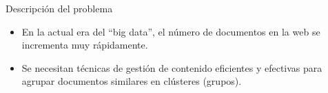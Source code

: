 \begin{frame}{Descripción del problema}
    
    \begin{itemize}
        \item 
        En la actual era del ``big data'', el 
        número de documentos en la web se 
        incrementa muy rápidamente.
        \item 
        Se necesitan técnicas de gestión 
        de contenido eficientes y efectivas
        para agrupar documentos similares en clústeres (grupos).
    \end{itemize}
    
    
\end{frame}